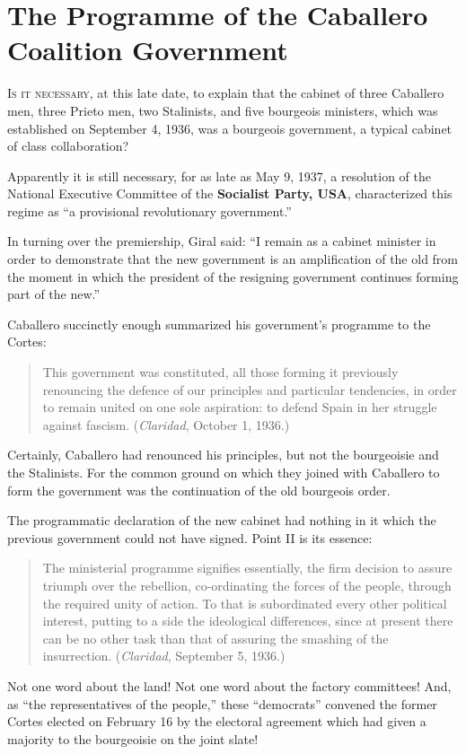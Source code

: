 \chapter{The Programme of the Caballero Coalition Government}

\textsc{Is it necessary}, at this late date, to explain that the cabinet of three Caballero men, three Prieto men, two Stalinists, and five bourgeois ministers, which was established on September 4, 1936, was a bourgeois government, a typical cabinet of class collaboration?

Apparently it is still necessary, for as late as May 9, 1937, a resolution of the National Executive Committee of the \textbf{Socialist Party, USA}, characterized this regime as ``a provisional revolutionary government.''

In turning over the premiership, Giral said: ``I remain as a cabinet minister in order to demonstrate that the new government is an amplification of the old from the moment in which the president of the resigning government continues forming part of the new.''

Caballero succinctly enough summarized his government’s programme to the Cortes:
\begin{quote}
  This government was constituted, all those forming it previously renouncing the defence of our principles and particular tendencies, in order to remain united on one sole aspiration: to defend Spain in her struggle against fascism. (\emph{Claridad}, October 1, 1936.)
\end{quote}
Certainly, Caballero had renounced his principles, but not the bourgeoisie and the Stalinists. For the common ground on which they joined with Caballero to form the government was the continuation of the old bourgeois order.

The programmatic declaration of the new cabinet had nothing in it which the previous government could not have signed. Point II is its essence:
\begin{quote}
  The ministerial programme signifies essentially, the firm decision to assure triumph over the rebellion, co-ordinating the forces of the people, through the required unity of action. To that is subordinated every other political interest, putting to a side the ideological differences, since at present there can be no other task than that of assuring the smashing of the insurrection. (\emph{Claridad}, September 5, 1936.)
\end{quote}
Not one word about the land! Not one word about the factory committees! And, as ``the representatives of the people,'' these ``democrats'' convened the former Cortes elected on February 16 by the electoral agreement which had given a majority to the bourgeoisie on the joint slate!

